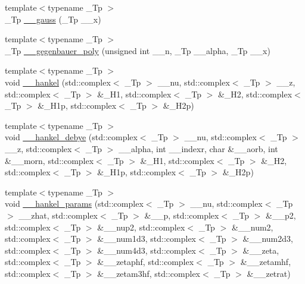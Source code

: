 \begin{DoxyCompactItemize}
{\footnotesize template$<$typename \+\_\+\+Tp $>$ }\\\+\_\+\+Tp \hyperlink{namespacestd_1_1____detail_afdb25beb2328b74d64d9be03de64c442}{\+\_\+\+\_\+gauss} (\+\_\+\+Tp \+\_\+\+\_\+x)
\item 
{\footnotesize template$<$typename \+\_\+\+Tp $>$ }\\\+\_\+\+Tp \hyperlink{namespacestd_1_1____detail_a5c2319a50d89d8067a46750708bf8563}{\+\_\+\+\_\+gegenbauer\+\_\+poly} (unsigned int \+\_\+\+\_\+n, \+\_\+\+Tp \+\_\+\+\_\+alpha, \+\_\+\+Tp \+\_\+\+\_\+x)
\item 
{\footnotesize template$<$typename \+\_\+\+Tp $>$ }\\void \hyperlink{namespacestd_1_1____detail_a55f221be4308a6e366968d5cf3b840c2}{\+\_\+\+\_\+hankel} (std\+::complex$<$ \+\_\+\+Tp $>$ \+\_\+\+\_\+nu, std\+::complex$<$ \+\_\+\+Tp $>$ \+\_\+\+\_\+z, std\+::complex$<$ \+\_\+\+Tp $>$ \&\+\_\+\+H1, std\+::complex$<$ \+\_\+\+Tp $>$ \&\+\_\+\+H2, std\+::complex$<$ \+\_\+\+Tp $>$ \&\+\_\+\+H1p, std\+::complex$<$ \+\_\+\+Tp $>$ \&\+\_\+\+H2p)
\item 
{\footnotesize template$<$typename \+\_\+\+Tp $>$ }\\void \hyperlink{namespacestd_1_1____detail_a4d1fa9f2ae57056ac102a33c2ddbe9c3}{\+\_\+\+\_\+hankel\+\_\+debye} (std\+::complex$<$ \+\_\+\+Tp $>$ \+\_\+\+\_\+nu, std\+::complex$<$ \+\_\+\+Tp $>$ \+\_\+\+\_\+z, std\+::complex$<$ \+\_\+\+Tp $>$ \+\_\+\+\_\+alpha, int \+\_\+\+\_\+indexr, char \&\+\_\+\+\_\+aorb, int \&\+\_\+\+\_\+morn, std\+::complex$<$ \+\_\+\+Tp $>$ \&\+\_\+\+H1, std\+::complex$<$ \+\_\+\+Tp $>$ \&\+\_\+\+H2, std\+::complex$<$ \+\_\+\+Tp $>$ \&\+\_\+\+H1p, std\+::complex$<$ \+\_\+\+Tp $>$ \&\+\_\+\+H2p)
\item 
{\footnotesize template$<$typename \+\_\+\+Tp $>$ }\\void \hyperlink{namespacestd_1_1____detail_aff42671a79cd3852a57752f79c82f8da}{\+\_\+\+\_\+hankel\+\_\+params} (std\+::complex$<$ \+\_\+\+Tp $>$ \+\_\+\+\_\+nu, std\+::complex$<$ \+\_\+\+Tp $>$ \+\_\+\+\_\+zhat, std\+::complex$<$ \+\_\+\+Tp $>$ \&\+\_\+\+\_\+p, std\+::complex$<$ \+\_\+\+Tp $>$ \&\+\_\+\+\_\+p2, std\+::complex$<$ \+\_\+\+Tp $>$ \&\+\_\+\+\_\+nup2, std\+::complex$<$ \+\_\+\+Tp $>$ \&\+\_\+\+\_\+num2, std\+::complex$<$ \+\_\+\+Tp $>$ \&\+\_\+\+\_\+num1d3, std\+::complex$<$ \+\_\+\+Tp $>$ \&\+\_\+\+\_\+num2d3, std\+::complex$<$ \+\_\+\+Tp $>$ \&\+\_\+\+\_\+num4d3, std\+::complex$<$ \+\_\+\+Tp $>$ \&\+\_\+\+\_\+zeta, std\+::complex$<$ \+\_\+\+Tp $>$ \&\+\_\+\+\_\+zetaphf, std\+::complex$<$ \+\_\+\+Tp $>$ \&\+\_\+\+\_\+zetamhf, std\+::complex$<$ \+\_\+\+Tp $>$ \&\+\_\+\+\_\+zetam3hf, std\+::complex$<$ \+\_\+\+Tp $>$ \&\+\_\+\+\_\+zetrat)

\end{DoxyCompactItemize}
